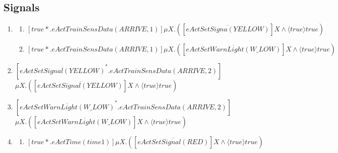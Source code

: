 \documentclass[10pt,a4paper]{article}
\begin{document}
\subsection{Signals}
\begin{enumerate}[resume]
\item
	\begin{enumerate}
    \item $[true*.eActTrainSensData(ARRIVE,1)]\mu X.([\overline{eActSetSigna(YELLOW)}]X \wedge \langle true\rangle  true)$
    \item $[true*.eActTrainSensData(ARRIVE,1)]\mu X.([\overline{eActSetWarnLight(W\_LOW)}]X \wedge \langle true\rangle	true)$
    \end{enumerate}
\item
$[\overline{eActSetSignal(YELLOW)}^*.eActTrainSensData(ARRIVE,2)] $\\$ \mu X.([\overline{eActSetSignal(YELLOW)}]X \wedge \langle true\rangle  true)$

\item $[\overline{eActSetWarnLight(W\_LOW)}^*.eActTrainSensData(ARRIVE,2)] $\\$ \mu X.([\overline{eActSetWarnLight(W\_LOW)}]X \wedge \langle true\rangle  true)$

\item
	\begin{enumerate}
    \item $[true*.eActTime(time1)]\mu X.([\overline{eActSetSignal(RED)}]X \wedge \langle true\rangle  true)$


\end{enumerate}
\end{enumerate}
\end{document}
